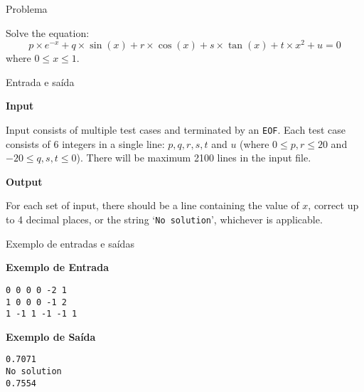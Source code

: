
\begin{frame}[fragile]{Problema}

Solve the equation:
\[
    p\times e^{-x} + q\times \sin(x) + r\times \cos(x) + s\times \tan(x) + t\times x^2 + u = 0
\]
where $0\leq x\leq 1$.

\end{frame}

\begin{frame}[fragile]{Entrada e saída}

\textbf{Input}

Input consists of multiple test cases and terminated by an \texttt{EOF}. Each test case consists 
of 6 integers in a single line: $p, q, r, s, t$ and $u$ (where $0\leq p, r\leq 20$ and $-20\leq q, s, t\leq 0$). There will be maximum 2100 lines in the input file.

\vspace{0.1in}

\textbf{Output}

For each set of input, there should be a line containing the value of $x$, correct up to 4 
decimal places, or the string `\texttt{No solution}', whichever is applicable.

\end{frame}

\begin{frame}[fragile]{Exemplo de entradas e saídas}

\begin{minipage}[t]{0.5\textwidth}
\textbf{Exemplo de Entrada}
\begin{verbatim}
0 0 0 0 -2 1
1 0 0 0 -1 2
1 -1 1 -1 -1 1
\end{verbatim}
\end{minipage}
\begin{minipage}[t]{0.45\textwidth}
\textbf{Exemplo de Saída}
\begin{verbatim}
0.7071
No solution
0.7554
\end{verbatim}
\end{minipage}
\end{frame}

